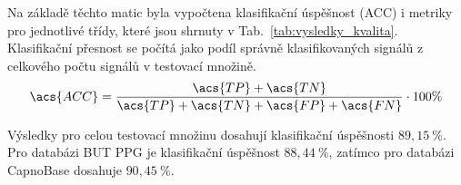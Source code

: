 Na základě těchto matic byla vypočtena klasifikační úspěšnost (\acs{ACC}) i metriky pro jednotlivé třídy, které jsou shrnuty v Tab.~\ref{tab:vysledky_kvalita}.
Klasifikační přesnost se počítá jako podíl správně klasifikovaných signálů z celkového počtu signálů v testovací množině.
\begin{equation}
	\label{eq:acc}
	\acs{ACC} = \frac{\acs{TP} + \acs{TN}}{\acs{TP} + \acs{TN} + \acs{FP} + \acs{FN}} \cdot 100\%
\end{equation}

Výsledky pro celou testovací množinu dosahují klasifikační úspěšnosti $89,15~\%$.
Pro databázi \acs{BUT PPG} je klasifikační úspěšnost $88,44~\%$, zatímco pro databázi CapnoBase dosahuje $90,45~\%$.